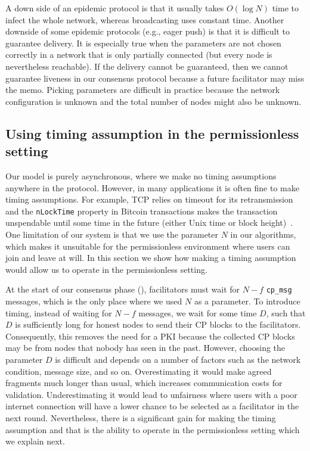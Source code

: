 A down side of an epidemic protocol is that it usually takes $O(\log N)$ time to infect the whole network,
whereas broadcasting uses constant time.
Another downside of some epidemic protocols (e.g., eager push) is that it is difficult to guarantee delivery.
It is especially true when the parameters are not chosen correctly in a network that is only partially connected (but every node is nevertheless reachable).
If the delivery cannot be guaranteed, 
then we cannot guarantee liveness in our consensus protocol because a future facilitator may miss the memo.
Picking parameters are difficult in practice because the network configuration is unknown and the total number of nodes might also be unknown.


\subsection{Using timing assumption in the permissionless setting}
\label{sec:permissionless}
Our model is purely asynchronous, where we make no timing assumptions anywhere in the protocol.
However, in many applications it is often fine to make timing assumptions.
For example, TCP relies on timeout for its retransmission and the \texttt{nLockTime} property in Bitcoin transactions makes the transaction unspendable until some time in the future (either Unix time or block height)~\cite{bitcoindevguide}.
One limitation of our system is that we use the parameter $N$ in our algorithms, which makes it unsuitable for the permissionless environment where users can join and leave at will.
In this section we show how making a timing assumption would allow us to operate in the permissionless setting.

At the start of our consensus phase (), facilitators must wait for $N-f$ \texttt{cp\_msg} messages,
which is the only place where we used $N$ as a parameter.
To introduce timing, instead of waiting for $N-f$ messages, we wait for some time $D$,
such that $D$ is sufficiently long for honest nodes to send their CP blocks to the facilitators.
Consequently, this removes the need for a PKI because the collected CP blocks may be from nodes that nobody has seen in the past.
However, choosing the parameter $D$ is difficult and depends on a number of factors such as the network condition, message size, and so on.
Overestimating it would make agreed fragments much longer than usual, which increases communication costs for validation.
Underestimating it would lead to unfairness where users with a poor internet connection will have a lower chance to be selected as a facilitator in the next round.
Nevertheless, there is a significant gain for making the timing assumption and that is the ability to operate in the permissionless setting which we explain next.


